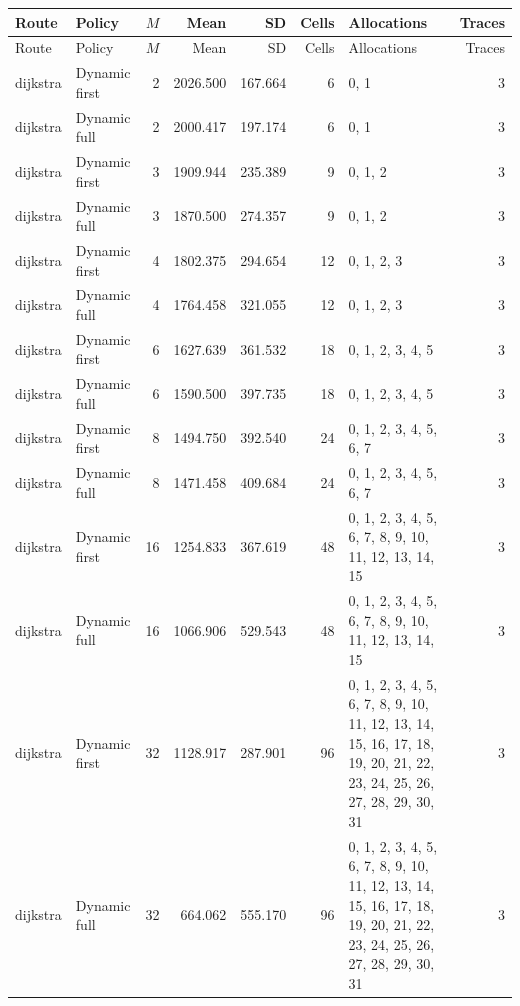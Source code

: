 \documentclass[10pt,a4paper]{article}
\begin{document}
\tiny\setlength{\tabcolsep}{2pt}\begin{longtable}{@{}p{23mm}p{29mm}rrrrp{36mm}r@{}}
\toprule Route & Policy & $M$ & Mean & SD & Cells & Allocations & Traces \\ \midrule\endfirsthead
\toprule Route & Policy & $M$ & Mean & SD & Cells & Allocations & Traces \\ \midrule\endhead
\bottomrule\endfoot
dijkstra & Dynamic first & 2 & 2026.500 & 167.664 & 6 & 0, 1 & 3 \\
dijkstra & Dynamic full & 2 & 2000.417 & 197.174 & 6 & 0, 1 & 3 \\
dijkstra & Dynamic first & 3 & 1909.944 & 235.389 & 9 & 0, 1, 2 & 3 \\
dijkstra & Dynamic full & 3 & 1870.500 & 274.357 & 9 & 0, 1, 2 & 3 \\
dijkstra & Dynamic first & 4 & 1802.375 & 294.654 & 12 & 0, 1, 2, 3 & 3 \\
dijkstra & Dynamic full & 4 & 1764.458 & 321.055 & 12 & 0, 1, 2, 3 & 3 \\
dijkstra & Dynamic first & 6 & 1627.639 & 361.532 & 18 & 0, 1, 2, 3, 4, 5 & 3 \\
dijkstra & Dynamic full & 6 & 1590.500 & 397.735 & 18 & 0, 1, 2, 3, 4, 5 & 3 \\
dijkstra & Dynamic first & 8 & 1494.750 & 392.540 & 24 & 0, 1, 2, 3, 4, 5, 6, 7 & 3 \\
dijkstra & Dynamic full & 8 & 1471.458 & 409.684 & 24 & 0, 1, 2, 3, 4, 5, 6, 7 & 3 \\
dijkstra & Dynamic first & 16 & 1254.833 & 367.619 & 48 & 0, 1, 2, 3, 4, 5, 6, 7, 8, 9, 10, 11, 12, 13, 14, 15 & 3 \\
dijkstra & Dynamic full & 16 & 1066.906 & 529.543 & 48 & 0, 1, 2, 3, 4, 5, 6, 7, 8, 9, 10, 11, 12, 13, 14, 15 & 3 \\
dijkstra & Dynamic first & 32 & 1128.917 & 287.901 & 96 & 0, 1, 2, 3, 4, 5, 6, 7, 8, 9, 10, 11, 12, 13, 14, 15, 16, 17, 18, 19, 20, 21, 22, 23, 24, 25, 26, 27, 28, 29, 30, 31 & 3 \\
dijkstra & Dynamic full & 32 & 664.062 & 555.170 & 96 & 0, 1, 2, 3, 4, 5, 6, 7, 8, 9, 10, 11, 12, 13, 14, 15, 16, 17, 18, 19, 20, 21, 22, 23, 24, 25, 26, 27, 28, 29, 30, 31 & 3 \\
\end{longtable}\normalsize\setlength{\tabcolsep}{6pt}
\clearpage
\end{document}
